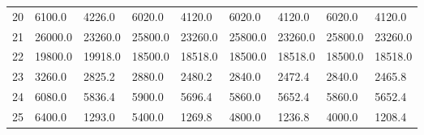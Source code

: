 \begin{tabular}{|r|l|l|l|l|l|l|l|l|}
  20 & 6100.0 & 4226.0 & 6020.0 & 4120.0 & 6020.0 & 4120.0 & 6020.0 & 4120.0 \\ 
  21 & 26000.0 & 23260.0 & 25800.0 & 23260.0 & 25800.0 & 23260.0 & 25800.0 & 23260.0 \\ 
  22 & 19800.0 & 19918.0 & 18500.0 & 18518.0 & 18500.0 & 18518.0 & 18500.0 & 18518.0 \\ 
  23 & 3260.0 & 2825.2 & 2880.0 & 2480.2 & 2840.0 & 2472.4 & 2840.0 & 2465.8 \\ 
  24 & 6080.0 & 5836.4 & 5900.0 & 5696.4 & 5860.0 & 5652.4 & 5860.0 & 5652.4 \\ 
  25 & 6400.0 & 1293.0 & 5400.0 & 1269.8 & 4800.0 & 1236.8 & 4000.0 & 1208.4 \\ 
\end{tabular}
